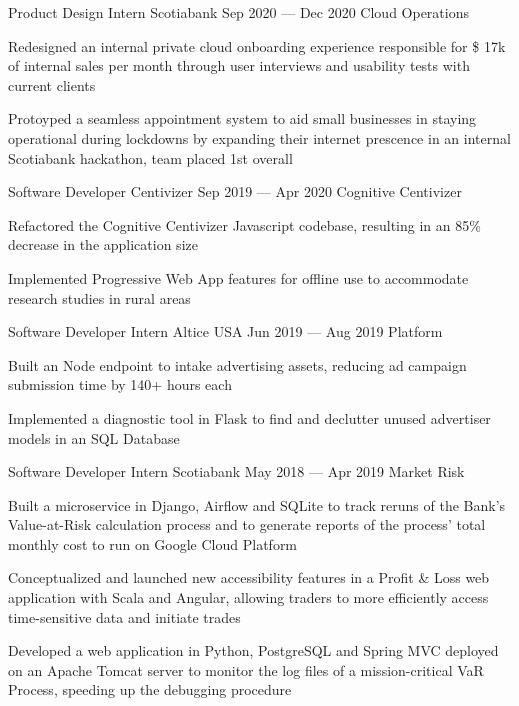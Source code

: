 \begin{cventries}
  \cventry
    {Product Design Intern}
    {Scotiabank}
    {}
    {Sep 2020 --- Dec 2020}
    {Cloud Operations}
    {
      \begin{cvitems}
        \item {Redesigned an internal private cloud onboarding experience responsible for \$ 17k of internal sales per month through user interviews and usability tests with current clients}
        \item {Protoyped a seamless appointment system to aid small businesses in staying operational during lockdowns by expanding their internet prescence in an internal Scotiabank hackathon, team placed 1st overall}
      \end{cvitems}
    }
  \cventry
    {Software Developer}
    {Centivizer}
    {}
    {Sep 2019 --- Apr 2020}
    {Cognitive Centivizer}
    {
      \begin{cvitems}
        \item {Refactored the Cognitive Centivizer Javascript codebase, resulting in an 85\% decrease in the application size}
        \item {Implemented Progressive Web App features for offline use to accommodate research studies in rural areas}
      \end{cvitems}
    }

  \cventry
    {Software Developer Intern}
    {Altice USA}
    {}
    {Jun 2019 --- Aug 2019}
    {Platform}
    {
    \begin{cvitems}
      \item {Built an Node endpoint to intake advertising assets, reducing ad campaign submission time by 140+ hours each}
      \item {Implemented a diagnostic tool in Flask to find and declutter unused advertiser models in an SQL Database}
    \end{cvitems}
    }

  \cventry
    {Software Developer Intern}
    {Scotiabank}
    {}
    {May 2018 --- Apr 2019}
    {Market Risk}
    {
      \begin{cvitems}
        \item {Built a microservice in Django, Airflow and SQLite to track reruns of the Bank's Value-at-Risk calculation process and to generate reports of the process' total monthly cost to run on Google Cloud Platform}
        \item {Conceptualized and launched new accessibility features in a Profit \& Loss web application with Scala and Angular, allowing traders to more efficiently access time-sensitive data and initiate trades}
        \item {Developed a web application in Python, PostgreSQL and Spring MVC deployed on an Apache Tomcat server to monitor the log files of a mission-critical VaR Process, speeding up the debugging procedure}
      \end{cvitems}
    }
\end{cventries}
